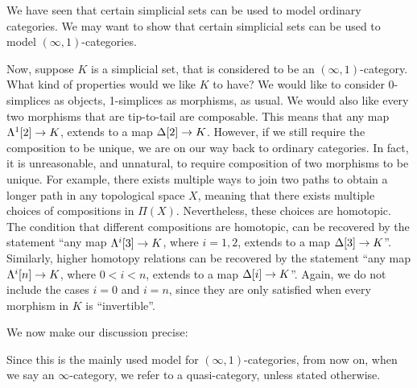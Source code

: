 We have seen that certain simplicial sets can be used to model ordinary categories. We may want to show that certain simplicial sets can 
be used to model $(\infty,1)$-categories. 

Now, suppose $K$ is a simplicial set, that is considered to be an $(\infty,1)$-category. 
What kind of properties would we like $K$ to have? We would like to consider 0-simplices as objects, 1-simplices as morphisms, as usual.
We would also like every two morphisms that are tip-to-tail are composable. This means that any map $\Lambda^1[2]\to K$, extends to a map $\Delta[2]\to K$.
However, if we still require the composition to be unique, we are on our way back to ordinary categories. In fact, it is unreasonable,
and unnatural, to require composition of two morphisms to be unique. For example, there exists multiple ways to join two paths 
to obtain a longer path in any topological space $X$, meaning that there exists multiple choices of compositions in $\Pi(X)$. Nevertheless,
these choices are homotopic. The condition that different compositions are homotopic, can be recovered by the statement
``any map $\Lambda^i[3]\to K$, where $i=1,2$, extends to a map $\Delta[3]\to K$''. Similarly, higher homotopy relations can be recovered by the statement
``any map $\Lambda^i[n]\to K$, where $0<i<n$, extends to a map $\Delta[i]\to K$''. Again, we do not include the cases $i=0$ and $i=n$,
since they are only satisfied when every morphism in $K$ is ``invertible''. 

We now make our discussion precise:


Since this is the mainly used model for $(\infty,1)$-categories, from now on, when we say an $\infty$-category, we refer to a quasi-category,
unless stated otherwise.



